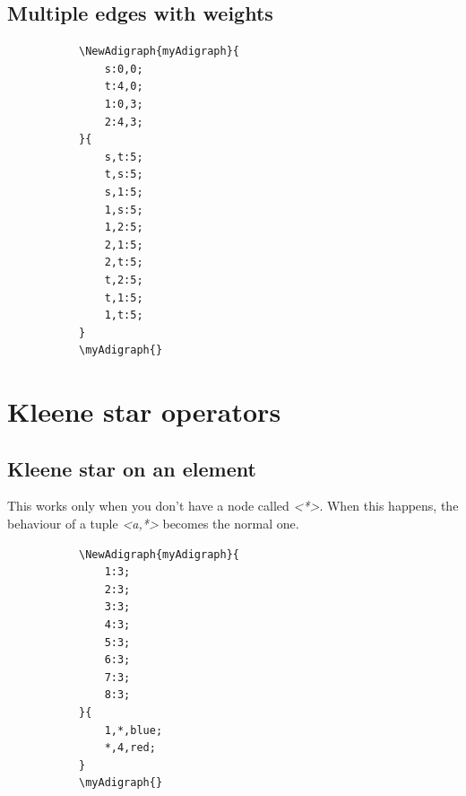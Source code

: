 \documentclass{report}
\begin{document}
\subsection{Multiple edges with weights}
\begin{figure}
	\begin{subfigure}{0.49\textwidth}
		\begin{verbatim}
\NewAdigraph{myAdigraph}{
	s:0,0;
	t:4,0;
	1:0,3;
	2:4,3;
}{
	s,t:5;
	t,s:5;
	s,1:5;
	1,s:5;
	1,2:5;
	2,1:5;
	2,t:5;
	t,2:5;
	t,1:5;
	1,t:5;
}
\myAdigraph{}
\end{verbatim}
	\end{subfigure}
	\begin{subfigure}{0.49\textwidth}
		\myAdigraph{}
	\end{subfigure}
\end{figure}

\section{Kleene star operators}
\subsection{Kleene star on an element}
This works only when you don't have a node called \textit{<*>}. When this happens, the behaviour of a tuple \textit{<a,*>} becomes the normal one.
\begin{figure}
	\begin{subfigure}{0.49\textwidth}
		\begin{verbatim}
\NewAdigraph{myAdigraph}{
	1:3;
	2:3;
	3:3;
	4:3;
	5:3;
	6:3;
	7:3;
	8:3;
}{
	1,*,blue;
	*,4,red;
}
\myAdigraph{}
\end{verbatim}
	\end{subfigure}
	\begin{subfigure}{0.49\textwidth}
		\myAdigraph{}
	\end{subfigure}
\end{figure}
\end{document}

